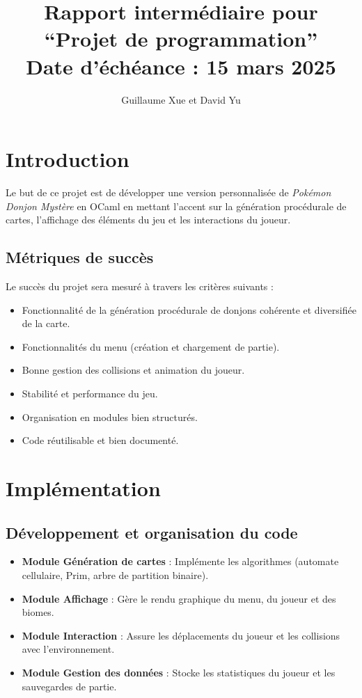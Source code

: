 \documentclass{article}
\title{
  Rapport intermédiaire pour \\
  ``Projet de programmation''\\
  Date d'échéance : 15 mars 2025
}
\author{Guillaume Xue et David Yu}
\begin{document}
\maketitle


\section{Introduction}
Le but de ce projet est de développer une version personnalisée 
de \textit{Pokémon Donjon Mystère} en OCaml en mettant l'accent 
sur la génération procédurale de cartes, l'affichage des éléments 
du jeu et les interactions du joueur.

\subsection{Métriques de succès}
Le succès du projet sera mesuré à travers les critères suivants :
\begin{itemize}
    \item Fonctionnalité de la génération procédurale de donjons 
    cohérente et diversifiée de la carte.
    \item Fonctionnalités du menu (création et chargement de partie).
    \item Bonne gestion des collisions et animation du joueur.
    \item Stabilité et performance du jeu.
    \item Organisation en modules bien structurés.
    \item Code réutilisable et bien documenté.
\end{itemize}

\section{Implémentation}

\subsection{Développement et organisation du code}
\begin{itemize}
  \item \textbf{Module Génération de cartes} : Implémente les algorithmes (automate cellulaire, Prim, arbre de partition binaire).
  \item \textbf{Module Affichage} : Gère le rendu graphique du menu, du joueur et des biomes.
  \item \textbf{Module Interaction} : Assure les déplacements du joueur et les collisions avec l’environnement.
  \item \textbf{Module Gestion des données} : Stocke les statistiques du joueur et les sauvegardes de partie.
\end{itemize}
\end{document}
